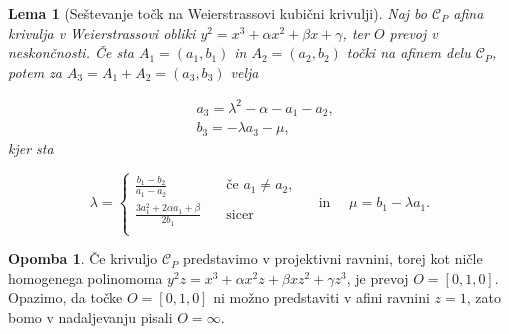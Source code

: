 \documentclass[12pt,a4paper,twoside]{article}
\theoremstyle{definition} %
\newtheorem{opomba}[definicija]{Opomba}
\theoremstyle{plain} %
\newtheorem{lema}[definicija]{Lema}
\numberwithin{equation}{section}  %
\begin{document}
\begin{lema}[Seštevanje točk na Weierstrassovi kubični krivulji]
\label{sestevanje}
Naj bo $\mathcal{C}_P$ afina krivulja v Weierstrassovi obliki $y^2 = x^3 + \alpha x^2 + \beta x + \gamma$, ter $O$ prevoj v neskončnosti. Če sta $A_1 = (a_1,b_1)$ in $A_2 = (a_2,b_2)$ točki na afinem delu $\mathcal{C}_P$, potem za $A_3 = A_1 + A_2 = (a_3,b_3)$ velja

\begin{align}
&{} a_3 = \lambda ^2 - \alpha - a_1 - a_2, \nonumber \\
&{} b_3 = -\lambda a_3 - \mu, \nonumber
\end{align}
kjer sta 

$$
\lambda =
\begin{cases}
\frac{b_1 - b_2}{a_1 - a_2} & \quad \text{če } a_1 \neq a_2 ,\\
\frac{3a_1^2+ 2 \alpha a_1 + \beta}{2b_1} & \quad \text{sicer}\\
\end{cases}
\quad
\text{ in }
\quad
\mu = b_1 - \lambda a_1.
$$

%

\end{lema}


\begin{opomba}
Če krivuljo $\mathcal{C}_P$ predstavimo v projektivni ravnini, torej kot ničle homogenega polinomoma $y^2z=x^3+\alpha x^2z+\beta xz^2+ \gamma z^3$, je prevoj $O=[0,1,0].$
Opazimo, da točke $O = [0,1,0]$ ni možno predstaviti v afini ravnini $z=1$, zato bomo v nadaljevanju pisali $O = \infty$.
\end{opomba}
\end{document}
